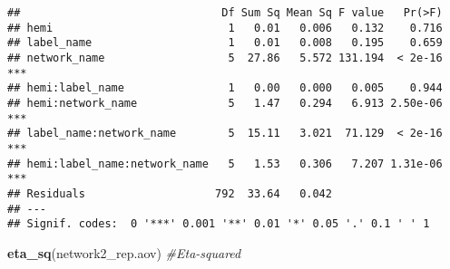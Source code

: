 \documentclass[
]{article}
\newenvironment{Shaded}{\begin{snugshade}}{\end{snugshade}}
\newcommand{\CommentTok}[1]{\textcolor[rgb]{0.56,0.35,0.01}{\textit{#1}}}
\newcommand{\DataTypeTok}[1]{\textcolor[rgb]{0.13,0.29,0.53}{#1}}
\newcommand{\KeywordTok}[1]{\textcolor[rgb]{0.13,0.29,0.53}{\textbf{#1}}}
\newcommand{\NormalTok}[1]{#1}
\newcommand{\OperatorTok}[1]{\textcolor[rgb]{0.81,0.36,0.00}{\textbf{#1}}}
\newcommand{\StringTok}[1]{\textcolor[rgb]{0.31,0.60,0.02}{#1}}
\begin{document}
\begin{Shaded}
\end{Shaded}

\begin{verbatim}
##                               Df Sum Sq Mean Sq F value   Pr(>F)    
## hemi                           1   0.01   0.006   0.132    0.716    
## label_name                     1   0.01   0.008   0.195    0.659    
## network_name                   5  27.86   5.572 131.194  < 2e-16 ***
## hemi:label_name                1   0.00   0.000   0.005    0.944    
## hemi:network_name              5   1.47   0.294   6.913 2.50e-06 ***
## label_name:network_name        5  15.11   3.021  71.129  < 2e-16 ***
## hemi:label_name:network_name   5   1.53   0.306   7.207 1.31e-06 ***
## Residuals                    792  33.64   0.042                     
## ---
## Signif. codes:  0 '***' 0.001 '**' 0.01 '*' 0.05 '.' 0.1 ' ' 1
\end{verbatim}

\begin{Shaded}
\begin{Highlighting}[]
\KeywordTok{eta_sq}\NormalTok{(network2_rep.aov) }\CommentTok{#Eta-squared}
\end{Highlighting}
\end{Shaded}
\end{document}
